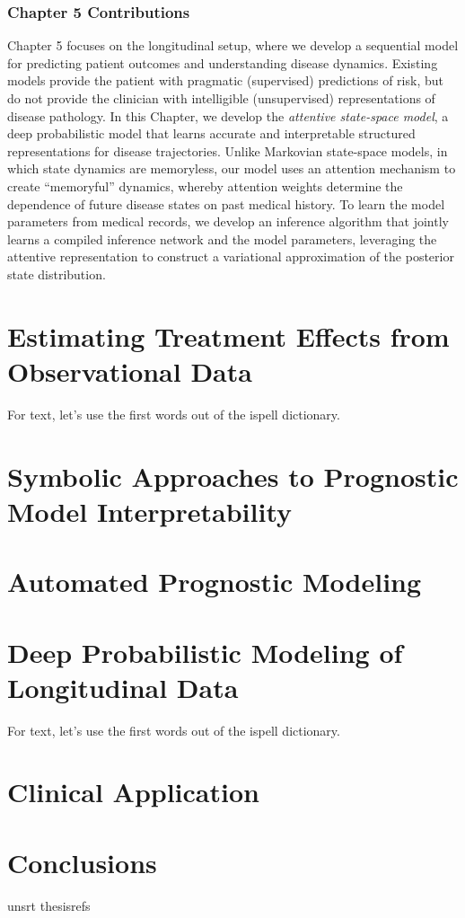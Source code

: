 \documentclass [PhD] {uclathes}
\begin{document}
\subsection*{Chapter 5 Contributions}
Chapter 5 focuses on the longitudinal setup, where we develop a sequential model for predicting patient outcomes and understanding disease dynamics. Existing models provide the patient with pragmatic (supervised) predictions of risk, but do not provide the clinician with intelligible (unsupervised) representations of disease pathology. In this Chapter, we develop the \textit{attentive state-space model}, a deep probabilistic model that learns accurate and interpretable structured representations for disease trajectories. Unlike Markovian state-space models, in which state dynamics are memoryless, our model uses an attention mechanism to create ``memoryful'' dynamics, whereby attention weights determine the dependence of future disease states on past medical history. To learn the model parameters from medical records, we develop an inference algorithm that jointly learns a compiled inference network and the model parameters, leveraging the attentive representation to construct a variational approximation of the posterior state distribution. 


\chapter{Estimating Treatment Effects from Observational Data}

For text, let's use the first words out of the ispell dictionary.

\chapter{Symbolic Approaches to Prognostic Model Interpretability}

\chapter{Automated Prognostic Modeling}

\chapter{Deep Probabilistic Modeling of Longitudinal Data}

For text, let's use the first words out of the ispell dictionary.

\chapter{Clinical Application}

\chapter{Conclusions}

 {unsrt} %
 {thesisrefs}    %
\end{document}
